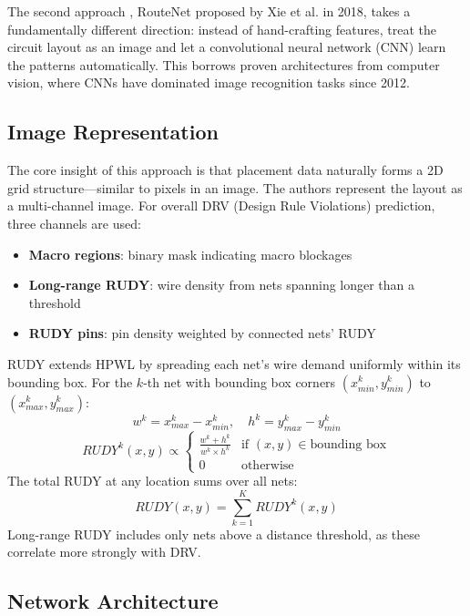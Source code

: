 \documentclass[sigconf]{acmart}
\begin{document}
The second approach \cite{xie2018routenet}, RouteNet proposed by Xie et al. in 2018, takes a
fundamentally different direction: instead of hand-crafting features,
treat the circuit layout as an image and let a convolutional neural
network (CNN) learn the patterns automatically. This borrows proven
architectures from computer vision, where CNNs have dominated image
recognition tasks since 2012.

\subsection{Image Representation}

The core insight of this approach is that placement data naturally forms a 2D grid
structure—similar to pixels in an image. The authors represent the
layout as a multi-channel image. For overall DRV (Design Rule Violations) prediction, three
channels are used:
\begin{itemize}
    \item \textbf{Macro regions}: binary mask indicating macro blockages
    \item \textbf{Long-range RUDY}: wire density from nets spanning
          longer than a threshold
    \item \textbf{RUDY pins}: pin density weighted by connected nets' RUDY
\end{itemize}

RUDY extends HPWL by spreading
each net's wire demand uniformly within its bounding box. For the
$k$-th net with bounding box corners $(x^k_{min}, y^k_{min})$ to
$(x^k_{max}, y^k_{max})$:
\begin{equation}
w^k = x^k_{max} - x^k_{min}, \quad h^k = y^k_{max} - y^k_{min}
\end{equation}
\begin{equation}
RUDY^k(x,y) \propto \begin{cases}
\frac{w^k + h^k}{w^k \times h^k} & \text{if } (x,y) \in \text{bounding box} \\
0 & \text{otherwise}
\end{cases}
\end{equation}
The total RUDY at any location sums over all nets:
\begin{equation}
RUDY(x,y) = \sum_{k=1}^{K} RUDY^k(x,y)
\end{equation}
Long-range RUDY includes only nets above a distance threshold, as
these correlate more strongly with DRV.

\subsection{Network Architecture}
\end{document}
